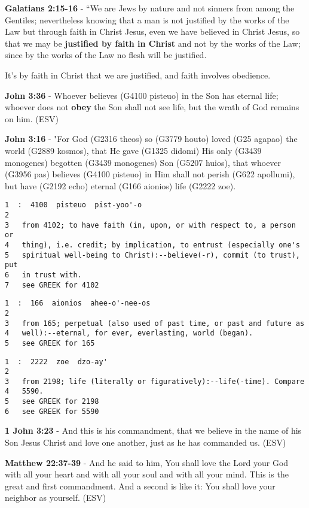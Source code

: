 \documentclass[11pt]{article}
\begin{document}
\textbf{Galatians 2:15-16} - “We are Jews by nature and not sinners from among the Gentiles; nevertheless knowing that a man is not justified by the works of the Law but through faith in Christ Jesus, even we have believed in Christ Jesus, so that we may be \textbf{justified by faith in Christ} and not by the works of the Law; since by the works of the Law no flesh will be justified.

It's by faith in Christ that we are justified, and faith involves obedience.

\textbf{John 3:36} - Whoever believes (G4100 pisteuo) in the Son has eternal life; whoever does not \textbf{obey} the Son shall not see life, but the wrath of God remains on him. (ESV)

\textbf{John 3:16} - "For God (G2316 theos) so (G3779 houto) loved (G25 agapao) the world (G2889 kosmos), that He gave (G1325 didomi) His only (G3439 monogenes) begotten (G3439 monogenes) Son (G5207 huios), that whoever (G3956 pas) believes (G4100 pisteuo) in Him shall not perish (G622 apollumi), but have (G2192 echo) eternal (G166 aionios) life (G2222 zoe).

\begin{verbatim}
1  :  4100  pisteuo  pist-yoo'-o
2  
3   from 4102; to have faith (in, upon, or with respect to, a person or
4   thing), i.e. credit; by implication, to entrust (especially one's
5   spiritual well-being to Christ):--believe(-r), commit (to trust), put
6   in trust with.
7   see GREEK for 4102
\end{verbatim}

\begin{verbatim}
1  :  166  aionios  ahee-o'-nee-os
2  
3   from 165; perpetual (also used of past time, or past and future as
4   well):--eternal, for ever, everlasting, world (began).
5   see GREEK for 165
\end{verbatim}

\begin{verbatim}
1  :  2222  zoe  dzo-ay'
2  
3   from 2198; life (literally or figuratively):--life(-time). Compare
4   5590.
5   see GREEK for 2198
6   see GREEK for 5590
\end{verbatim}

\textbf{1 John 3:23} - And this is his commandment, that we believe in the name of his Son Jesus Christ and love one another, just as he has commanded us. (ESV)

\textbf{Matthew 22:37-39} - And he said to him, You shall love the Lord your God with all your heart and with all your soul and with all your mind. This is the great and first commandment. And a second is like it: You shall love your neighbor as yourself. (ESV)
\end{document}
